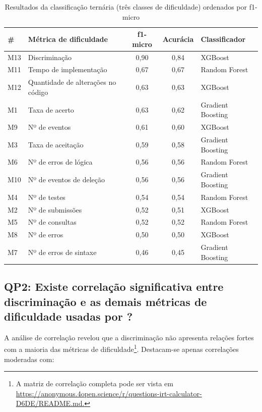 \documentclass[12pt]{article}
\begin{document}
\begin{table}[h!]
    \centering
    \footnotesize
    \caption{Resultados da classificação ternária (três classes de dificuldade) ordenados por f1-micro}
    \label{tab:tabela_class_ternaria}
    \begin{tabular}{@{}llccl@{}}
        \toprule
        \textbf{\#} & \textbf{Métrica de dificuldade} & \textbf{f1-micro} & \textbf{Acurácia} & \textbf{Classificador} \\
        \midrule
        M13 & Discriminação & 0,90 & 0,84 & XGBoost \\
        M11 & Tempo de implementação & 0,67 & 0,67 & Random Forest \\
        M12 & Quantidade de alterações no código & 0,63 & 0,63 & XGBoost \\
        M1 & Taxa de acerto & 0,63 & 0,62 & Gradient Boosting \\
        M9 & Nº de eventos & 0,61 & 0,60 & XGBoost \\
        M3 & Taxa de aceitação & 0,59 & 0,58 & Gradient Boosting \\
        M6 & Nº de erros de lógica & 0,56 & 0,56 & Random Forest \\
        M10 & Nº de eventos de deleção & 0,56 & 0,56 & Gradient Boosting \\
        M4 & Nº de testes & 0,54 & 0,54 & Random Forest \\
        M2 & Nº de submissões & 0,52 & 0,51 & XGBoost \\
        M5 & Nº de consultas & 0,52 & 0,52 & Random Forest \\
        M8 & Nº de erros & 0,50 & 0,50 & XGBoost \\
        M7 & Nº de erros de sintaxe & 0,46 & 0,45 & Gradient Boosting \\
        \bottomrule
    \end{tabular}
\end{table}


\subsection{QP2: Existe correlação significativa entre discriminação e as demais métricas de dificuldade usadas por \cite{jackson2023}?}
\label{sec:resultados_QP2}

A análise de correlação revelou que a discriminação não apresenta relações fortes com a maioria das métricas de dificuldade\footnote{A matriz de correlação completa pode ser vista em \url{https://anonymous.4open.science/r/questions-irt-calculator-D6DE/README.md.}}. Destacam-se apenas correlações moderadas com:
\end{document}
